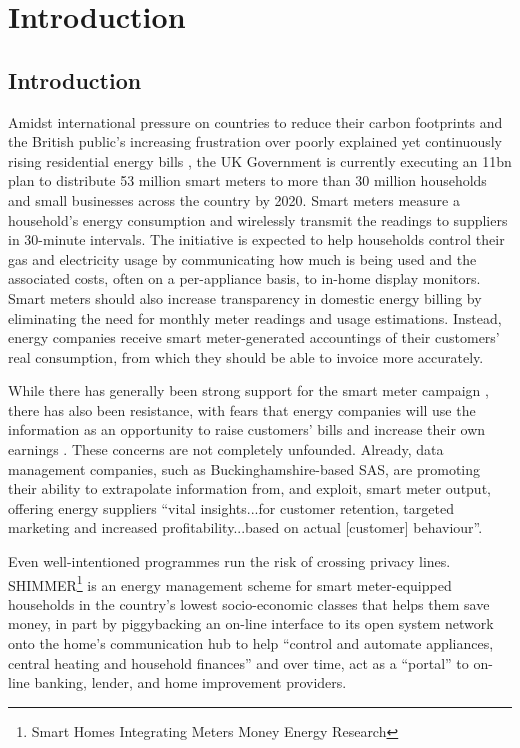 \chapter{Introduction}
\section{Introduction}
Amidst international pressure on countries to reduce their carbon footprints \cite{E_spending,DECC_1} and the British public's increasing frustration over poorly explained yet continuously rising residential energy bills \cite{E_spending}, the UK Government is currently executing an \textsterling 11bn plan to distribute 53 million smart meters to more than 30 million households and small businesses across the country by 2020. Smart meters measure a household's energy consumption and wirelessly transmit the readings to suppliers in 30-minute intervals.  The initiative is expected to help households control their gas and electricity usage by communicating how much is being used and the associated costs, often on a per-appliance basis, to in-home display monitors. Smart meters should also increase transparency in domestic energy billing by eliminating the need for monthly meter readings and usage estimations. Instead, energy companies receive smart meter-generated accountings of their customers' real consumption, from which they should be able to invoice more accurately.  

While there has generally been strong support for the smart meter campaign \cite{DECC_1}, there has also been resistance, with fears that energy companies will use the information as an opportunity to raise customers' bills and increase their own earnings \cite{stop,Anderson}. These concerns are not completely unfounded. Already, data management companies, such as Buckinghamshire-based SAS, are promoting their ability to extrapolate information from, and exploit, smart meter output, offering energy suppliers ``vital insights...for customer retention, targeted marketing and increased profitability...based on actual [customer] behaviour''\cite{SAS}. 

Even well-intentioned programmes run the risk of crossing privacy lines. SHIMMER\footnote{Smart Homes Integrating Meters Money Energy Research}\cite{SHIMMER} is an energy management scheme for smart meter-equipped households in the country's lowest socio-economic classes that helps them save money, in part by piggybacking an on-line interface to its open system network onto the home's communication hub to help ``control and automate appliances, central heating and household finances'' and over time, act as a ``portal'' to on-line banking, lender, and home improvement providers. 

